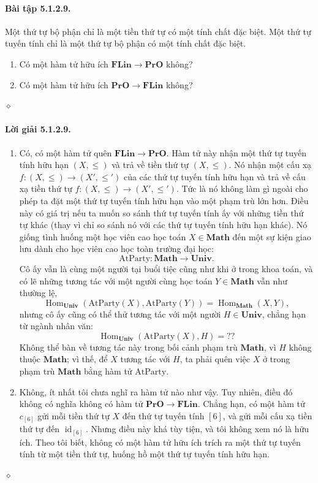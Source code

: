 \paragraph{Bài tập 5.1.2.9.} Một thứ tự bộ phận chỉ là một tiền thứ tự có một tính chất đặc biệt. Một thứ tự tuyến tính chỉ là một thứ tự bộ phận có một tính chất đặc biệt.
\begin{enumerate}[label=\alph*.]\item Có một hàm tử hữu ích $\mathbf{FLin}\to\mathbf{PrO}$ không?\item Có một hàm tử hữu ích $\mathbf{PrO}\to\mathbf{FLin}$ không?\end{enumerate}\hfill$\diamond$
\paragraph{Lời giải 5.1.2.9.}
\begin{enumerate}[label=\alph*.]
\item Có, có một hàm tử quên $\mathbf{FLin}\to\mathbf{PrO}$. Hàm tử này nhận một thứ tự tuyến tính hữu hạn $(X,\leq)$ và trả về tiền thứ tự $(X,\leq)$. Nó nhận một cấu xạ $f:(X,\leq)\to(X',\leq')$ của các
thứ tự tuyến tính hữu hạn và trả về cấu xạ tiền thứ tự $f:(X,\leq)\to(X',\leq')$. Tức là nó không làm gì ngoài cho phép ta đặt một thứ tự tuyến tính hữu hạn vào một phạm trù lớn hơn. Điều này có giá trị nếu ta muốn so sánh thứ tự tuyến tính ấy với những tiền thứ tự khác (thay vì chỉ so sánh nó với các thứ tự tuyến tính hữu hạn khác). Nó giống tình huống một học viên cao học toán $X\in\mathbf{Math}$ đến một sự kiện giao lưu dành cho học viên cao học toàn trường đại học:
\[\mathrm{AtParty}:\mathbf{Math}\longrightarrow\mathbf{Univ}.\]
Cô ấy vẫn là cùng một người tại buổi tiệc cũng như khi ở trong khoa toán, và có lẽ những tương tác với một người cùng học toán $Y\in\mathbf{Math}$ vẫn như thường lệ,
\[\operatorname{Hom}_{\mathbf{Univ}}(\mathrm{AtParty}(X),\mathrm{AtParty}(Y))=\operatorname{Hom}_{\mathbf{Math}}(X,Y),\]
nhưng cô ấy cũng có thể thử tương tác với một người $H\in\mathbf{Univ}$, chẳng hạn từ ngành nhân văn:
\[\operatorname{Hom}_{\mathbf{Univ}}(\mathrm{AtParty}(X),H)=??\]
Không thể bàn về tương tác này trong bối cảnh phạm trù $\mathbf{Math}$, vì $H$ không thuộc $\mathbf{Math}$; vì thế, để $X$ tương tác với $H$, ta phải quên việc $X$ ở trong phạm trù $\mathbf{Math}$ bằng hàm tử $\mathrm{AtParty}$.
\item Không, ít nhất tôi chưa nghĩ ra hàm tử nào như vậy. Tuy nhiên, điều đó không có nghĩa không có hàm tử $\mathbf{PrO}\to\mathbf{FLin}$. Chẳng hạn, có một hàm tử $c_{[6]}$ gửi mỗi tiền thứ tự $X$ đến thứ tự tuyến tính $[6]$, và gửi mỗi cấu xạ tiền thứ tự đến $\operatorname{id}_{[6]}$. Nhưng điều này khá tùy tiện, và tôi không xem nó là hữu ích. Theo tôi biết, không có một hàm tử hữu ích trích ra một thứ tự tuyến tính từ một tiền thứ tự, huống hồ một thứ tự tuyến tính hữu hạn.
\end{enumerate}\hfill$\diamond$
